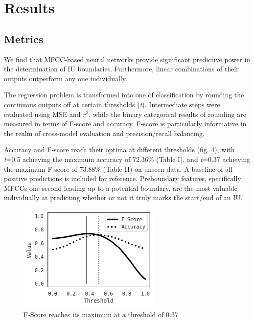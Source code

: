 \documentclass[conference]{IEEEtran}
\begin{document}
\section{Results}
\subsection{Metrics}\label{AA}
We find that MFCC-based neural networks provide significant predictive power in the determination of IU boundaries. Furthermore, linear combinations of their outputs outperform any one individually.

The regression problem is transformed into one of classification by rounding the continuous outputs off at certain thresholds (\emph{t}). Intermediate steps were evaluated using MSE and $r^2$, while the binary categorical results of rounding are measured in terms of F-score and accuracy. F-score is particularly informative in the realm of cross-model evaluation and precision/recall balancing.

Accuracy and F-score reach their optima at different thresholds (fig. 4), with \emph{t}=0.5 achieving the maximum accuracy of 72.36\% (Table I), and \emph{t}=0.37 achieving the maximum F-score of 73.88\% (Table II) on unseen data. A baseline of all positive predictions is included for reference. Preboundary features, specifically MFCCs one second leading up to a potential boundary, are the most valuable individually at predicting whether or not it truly marks the start/end of an IU.

\begin{figure}[htbp]
\centerline{\includegraphics[width=70mm]{f1_acc.png}}
\caption{F-Score reaches its maximum at a threshold of 0.37}
\label{fig}
\end{figure}
\end{document}
